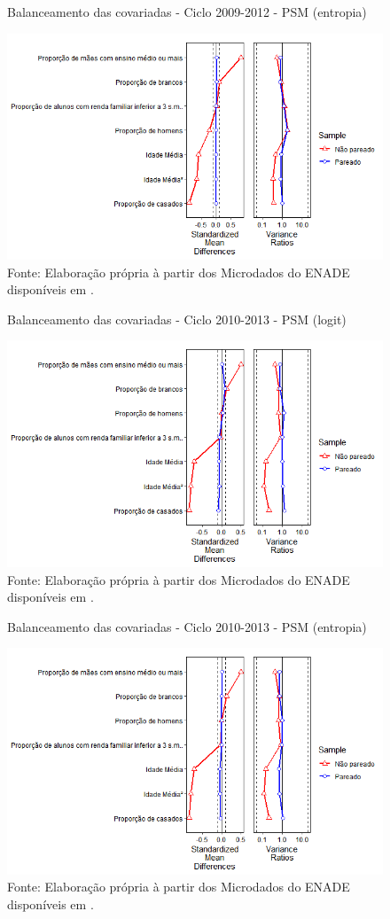 \begin{figure}[H]
	\centering
	\caption{Balanceamento das covariadas - Ciclo 2009-2012 - PSM (entropia)}
	\label{fig:balanceamento_covariadas_2009_2012_entropia}
	\includegraphics[width=0.7\linewidth]{"Figuras/balanceamento_covariadas_2009_2012_entropia.png"}
	\caption*{\RaggedRight Fonte: Elaboração própria à partir dos Microdados do ENADE disponíveis em \cite{INEP2020}.}
\end{figure}


\begin{figure}[H]
	\centering
	\caption{Balanceamento das covariadas - Ciclo 2010-2013 - PSM (logit)}
	\label{fig:balanceamento_covariadas_2010_2013_probit}
	\includegraphics[width=0.7\linewidth]{"Figuras/balanceamento_covariadas_2010_2013_logit.png"}
	\caption*{\RaggedRight Fonte: Elaboração própria à partir dos Microdados do ENADE disponíveis em \cite{INEP2020}.}
\end{figure}


\begin{figure}[H]
	\centering
	\caption{Balanceamento das covariadas - Ciclo 2010-2013 - PSM (entropia)}
	\label{fig:balanceamento_covariadas_2010_2013_entropia}
	\includegraphics[width=0.7\linewidth]{"Figuras/balanceamento_covariadas_2010_2013_entropia.png"}
	\caption*{\RaggedRight Fonte: Elaboração própria à partir dos Microdados do ENADE disponíveis em \cite{INEP2020}.}
\end{figure}

